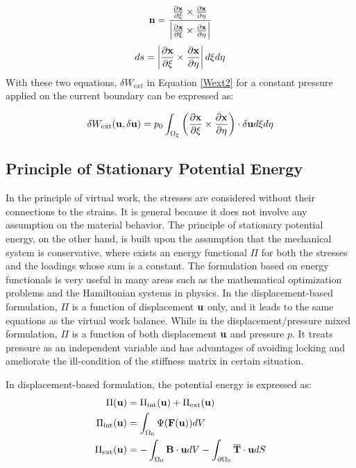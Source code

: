 \begin{equation}
\bold{n} = \frac{  \frac{\partial{\bold{x}}}{\partial{\xi}} \times  \frac{\partial{\bold{x}}}{\partial{\eta}} }{\left| \frac{\partial{\bold{x}}}{\partial{\xi}} \times  \frac{\partial{\bold{x}}}{\partial{\eta}} \right|}
\end{equation}
\begin{equation}
ds = \left|\frac{\partial{\bold{x}}}{\partial{\xi}} \times  \frac{\partial{\bold{x}}}{\partial{\eta}}\right| d\xi{d\eta}
\end{equation}
With these two equations, $\delta W_{ext}$ in Equation \ref{Wext2} for a constant pressure applied on the current boundary can be expressed as:

\begin{equation}
\delta{W_\mathrm{ext}}(\bold{u}, \delta{\bold{u}}) = p_0\int_{\Omega_{\xi}}  \left(\frac{\partial{\bold{x}}}{\partial{\xi}} \times  \frac{\partial{\bold{x}}}{\partial{\eta}}\right) \cdot\delta{\bold{u}}d\xi{d\eta}
\end{equation}

%
\subsection{Principle of Stationary Potential Energy}
In the principle of virtual work, the stresses are considered without their connections to the strains. It is general because it does not involve any assumption on the material behavior. The principle of stationary potential energy, on the other hand, is built upon the assumption that the mechanical system is conservative, where exists an energy functional $\Pi$ for both the stresses and the loadings whose sum is a constant. The formulation based on energy functionals is very useful in many areas such as the mathematical optimization problems and the Hamiltonian systems in physics. In the displacement-based formulation, $\Pi$ is a function of displacement $\bold{u}$ only, and it leads to the same equations as the virtual work balance. While in the displacement/pressure mixed formulation, $\Pi$ is a function of both displacement $\bold{u}$ and pressure $p$. It treats pressure as an independent variable and has advantages of avoiding locking and ameliorate the ill-condition of the stiffness matrix in certain situation.

In displacement-based formulation, the potential energy is expressed as:
\begin{subequations}
\begin{align}
\Pi(\bold{u}) &= \Pi_\mathrm{int}(\bold{u}) + \Pi_\mathrm{ext}(\bold{u}) \\
\Pi_\mathrm{int}(\bold{u}) &= \int_{\Omega_{0}}\Psi(\bold{F}(\bold{u}))dV  \label{pint} \\
\Pi_\mathrm{ext}(\bold{u}) &=  - \int_{\Omega_0}\bold{B}\cdot\bold{u}dV -  \int_{\partial{\Omega_0}}\overline{\bold{T}}\cdot{\bold{u}}dS
\label{pext} 
\end{align}
\end{subequations}

